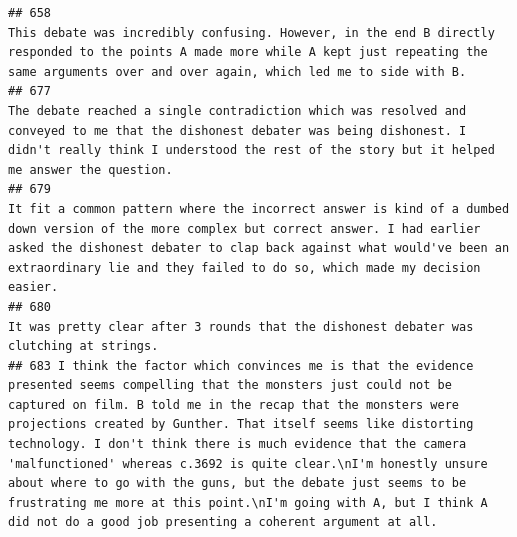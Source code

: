 \documentclass[
]{article}
\begin{document}
\begin{verbatim}
## 658                                                                                                                                                                                                                                                                                                                                                                                          This debate was incredibly confusing. However, in the end B directly responded to the points A made more while A kept just repeating the same arguments over and over again, which led me to side with B.
## 677                                                                                                                                                                                                                                                                                                                                                                    The debate reached a single contradiction which was resolved and conveyed to me that the dishonest debater was being dishonest. I didn't really think I understood the rest of the story but it helped me answer the question. 
## 679                                                                                                                                                                                                                                                                                                       It fit a common pattern where the incorrect answer is kind of a dumbed down version of the more complex but correct answer. I had earlier asked the dishonest debater to clap back against what would've been an extraordinary lie and they failed to do so, which made my decision easier. 
## 680                                                                                                                                                                                                                                                                                                                                                                                                                                                                                                           It was pretty clear after 3 rounds that the dishonest debater was clutching at strings. 
## 683 I think the factor which convinces me is that the evidence presented seems compelling that the monsters just could not be captured on film. B told me in the recap that the monsters were projections created by Gunther. That itself seems like distorting technology. I don't think there is much evidence that the camera 'malfunctioned' whereas c.3692 is quite clear.\nI'm honestly unsure about where to go with the guns, but the debate just seems to be frustrating me more at this point.\nI'm going with A, but I think A did not do a good job presenting a coherent argument at all.

\end{verbatim}
\end{document}
